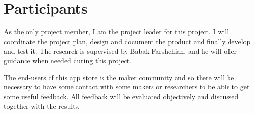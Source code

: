 \section{Participants}

As the only project member, I am the project leader for this project. I will coordinate the project plan, design and document the product and finally develop and test it. The research is supervised by Babak Farshchian, and he will offer guidance when needed during this project.

The end-users of this app store is the maker community and so there will be necessary to have some contact with some makers or researchers to be able to get some useful feedback. All feedback will be evaluated objectively and discussed together with the results.
